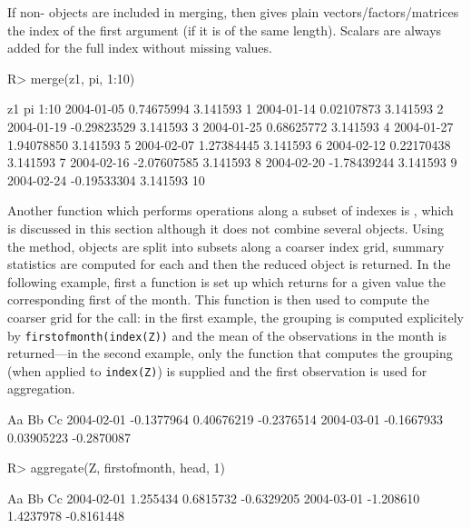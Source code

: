 \documentclass{Z}
\begin{document}
If non- objects are included in merging,
then  gives plain vectors/factors/matrices the index of the
first argument (if it is of the same length). Scalars are always added for
the full index without missing values.

\begin{Schunk}
\begin{Sinput}
R> merge(z1, pi, 1:10)
\end{Sinput}
\begin{Soutput}
                    z1       pi 1:10
2004-01-05  0.74675994 3.141593    1
2004-01-14  0.02107873 3.141593    2
2004-01-19 -0.29823529 3.141593    3
2004-01-25  0.68625772 3.141593    4
2004-01-27  1.94078850 3.141593    5
2004-02-07  1.27384445 3.141593    6
2004-02-12  0.22170438 3.141593    7
2004-02-16 -2.07607585 3.141593    8
2004-02-20 -1.78439244 3.141593    9
2004-02-24 -0.19533304 3.141593   10
\end{Soutput}
\end{Schunk}

Another function which performs operations along a subset of indexes
is , which is discussed in this section although
it does not combine several objects. Using the  method,  objects
are split into subsets along a coarser index grid,
summary statistics are computed for each and then the 
reduced object is returned. In the following example,
first a function is set up which returns for a given 
value the corresponding first of the month. This function is then
used to compute the coarser grid for the  call: in
the first example, the grouping is computed explicitely by \verb/firstofmonth(index(Z))/
and the mean of the observations in the month
is returned---in the second example, only the function that computes 
the grouping (when applied to \verb/index(Z)/) is supplied and
the first observation is used for aggregation.

\begin{Schunk}
\begin{Soutput}
                   Aa         Bb         Cc
2004-02-01 -0.1377964 0.40676219 -0.2376514
2004-03-01 -0.1667933 0.03905223 -0.2870087
\end{Soutput}
\begin{Sinput}
R> aggregate(Z, firstofmonth, head, 1)
\end{Sinput}
\begin{Soutput}
                  Aa        Bb         Cc
2004-02-01  1.255434 0.6815732 -0.6329205
2004-03-01 -1.208610 1.4237978 -0.8161448
\end{Soutput}
\end{Schunk}
\end{document}
